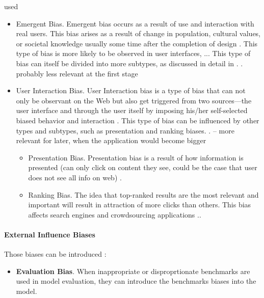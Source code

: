 \begin{refsection}
		\rawcitationstart
		used
		\begin{itemize}		
			\rawcitationusedstart
			\item Emergent Bias. Emergent bias occurs as a result of use and interaction with real users. This bias arises as a result of change in population, cultural values, or societal knowledge usually some time after the completion of design \autocite{M53_Friedman_1996}. This type of bias is more likely to be observed in user interfaces, ... This type of bias can itself be divided into more subtypes, as discussed in detail in \autocite{M53_Friedman_1996}. \autocite{Mehrabi_2021}. probably less relevant at the first stage
			
			\item User Interaction Bias. User Interaction bias is a type of bias that can not only be observant on the Web but also get triggered from two sources—the user interface and through the user itself by imposing his/her self-selected biased behavior and interaction \autocite{M9_Baeza-Yates_2018}. This type of bias can be influenced by other types and subtypes, such as presentation and ranking biases. \autocite{Mehrabi_2021}. -- more relevant for later, when the application would become bigger
			\rawcitationusedend
			\begin{itemize}
				\item Presentation Bias. Presentation bias is a result of how information is presented \autocite{M9_Baeza-Yates_2018} (can only click on content they see, could be the case that user does not see all info on web) \autocite{Mehrabi_2021}.
				\item Ranking Bias. The idea that top-ranked results are the most relevant and important will result in attraction of more clicks than others. This bias affects search engines \autocite{M9_Baeza-Yates_2018} and crowdsourcing applications \autocite{M93_Lerman_2014}.\autocite{Mehrabi_2021}.
			\end{itemize}
		\end{itemize}
		\rawcitationend
		
		\paragraph{External Influence Biases}
		
		Those biases can be introduced :
		\begin{itemize}
			\item \textbf{Evaluation Bias}. When inappropriate or disproprtionate benchmarks are used in model evaluation, they can introduce the benchmarks biases into the model. \autocites{M144_Suresh_2021}{M24_Buolamwini_2018}
			

\end{itemize}
\end{refsection}
